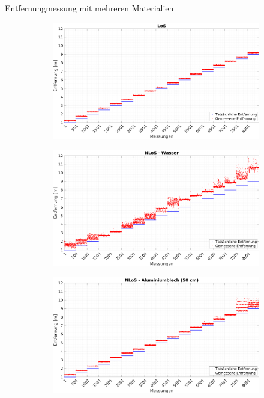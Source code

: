 \documentclass{beamer}
\begin{document}
%
%
\begin{frame}{Entfernungmessung mit mehreren Materialien}
	\begin{figure}
		\centering
		\begin{subfigure}[t]{0.47\linewidth}
			\centering
			\includegraphics[width=\linewidth]{entfernungsmessung_2018_01_20_los}
		\end{subfigure}
		\hfill
		\begin{subfigure}[t]{0.47\linewidth}
			\centering
			\includegraphics[width=\linewidth]{entfernungsmessung_2018_01_20_nlos_water}
		\end{subfigure}
		\par
		\bigskip
		\begin{subfigure}[t]{0.47\linewidth}
			\centering
			\includegraphics[width=\linewidth]{entfernungsmessung_2018_01_20_nlos_metal}

\end{subfigure}
\end{figure}
\end{frame}
\end{document}
